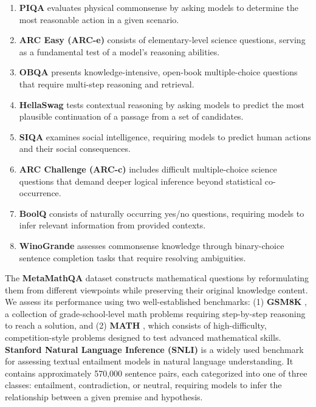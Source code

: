 \begin{enumerate}
\item \textbf{PIQA} \citep{bisk2020piqa} evaluates physical commonsense by asking models to determine the most reasonable action in a given scenario.
\item \textbf{ARC Easy (ARC-e)} \citep{clark2018think} consists of elementary-level science questions, serving as a fundamental test of a model’s reasoning abilities.
\item \textbf{OBQA} \citep{mihaylov2018can} presents knowledge-intensive, open-book multiple-choice questions that require multi-step reasoning and retrieval.
\item \textbf{HellaSwag} \citep{zellers2019hellaswag} tests contextual reasoning by asking models to predict the most plausible continuation of a passage from a set of candidates.
\item \textbf{SIQA} \citep{sap2019socialiqa} examines social intelligence, requiring models to predict human actions and their social consequences.
\item \textbf{ARC Challenge (ARC-c)} \citep{clark2018think} includes difficult multiple-choice science questions that demand deeper logical inference beyond statistical co-occurrence.
\item \textbf{BoolQ} \citep{clark2019boolq} consists of naturally occurring yes/no questions, requiring models to infer relevant information from provided contexts.
\item \textbf{WinoGrande} \citep{sakaguchi2021winogrande} assesses commonsense knowledge through binary-choice sentence completion tasks that require resolving ambiguities.
\end{enumerate}


The \textbf{MetaMathQA} dataset \citep{metamathqa} constructs mathematical questions by reformulating them from different viewpoints while preserving their original knowledge content. We assess its performance using two well-established benchmarks: (1) \textbf{GSM8K} \citep{gsm8k}, a collection of grade-school-level math problems requiring step-by-step reasoning to reach a solution, and (2) \textbf{MATH} \citep{math}, which consists of high-difficulty, competition-style problems designed to test advanced mathematical skills.
\\

\textbf{Stanford Natural Language Inference (SNLI)} is a widely used benchmark for assessing textual entailment models in natural language understanding. 
It contains approximately 570,000 sentence pairs, each categorized into one of three classes: entailment, contradiction, or neutral, requiring models to infer the relationship between a given premise and hypothesis.

